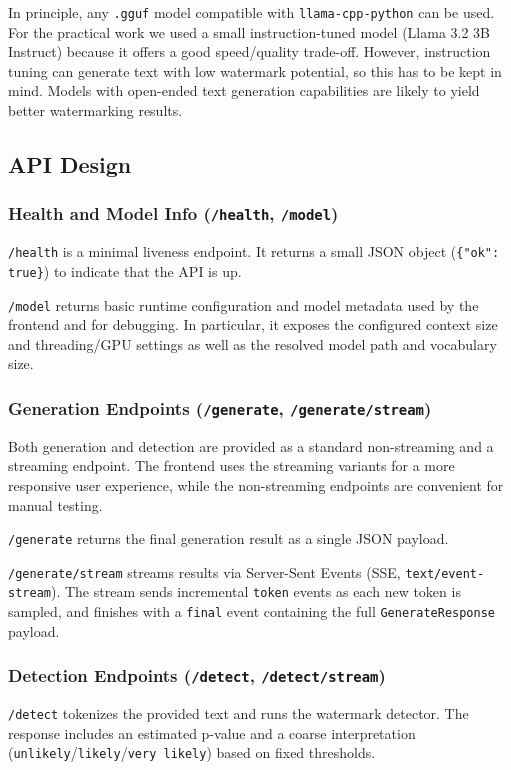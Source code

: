 In principle, any \texttt{.gguf} model compatible with \texttt{llama-cpp-python} can be used. For the practical work we
used a small instruction-tuned model (Llama 3.2 3B Instruct) because it offers a good speed/quality trade-off.
However, instruction tuning can generate text with low watermark potential, so this has to be kept in mind. Models with open-ended text generation capabilities are likely to yield better watermarking results.\cite{kuditipudi2023robustarticle}
\subsection{API Design}
\subsubsection{Health and Model Info (\texttt{/health}, \texttt{/model})}
\texttt{/health} is a minimal liveness endpoint. It returns a small
JSON object (\texttt{\{"ok": true\}}) to indicate that the API is up.

\texttt{/model} returns basic runtime configuration and model metadata used by the
frontend and for debugging. In particular, it exposes the configured context size and threading/GPU settings as well as
the resolved model path and vocabulary size.
\subsubsection{Generation Endpoints (\texttt{/generate}, \texttt{/generate/stream})}
Both generation and detection are provided as a standard non-streaming and a streaming endpoint. The frontend uses the
streaming variants for a more responsive user experience, while the non-streaming endpoints are convenient for manual
testing.

\texttt{/generate} returns the final generation result as a single JSON
payload.

\texttt{/generate/stream} streams results via Server-Sent Events (SSE, \texttt{text/event-stream}). The stream sends
incremental \texttt{token} events as each new token is sampled, and finishes with a \texttt{final} event containing the
full \texttt{GenerateResponse} payload.

\subsubsection{Detection Endpoints (\texttt{/detect}, \texttt{/detect/stream})}
\texttt{/detect} tokenizes the provided text and runs the watermark detector.
The response includes an estimated p-value and a coarse interpretation (\texttt{unlikely}/\texttt{likely}/\texttt{very likely})
based on fixed thresholds.

